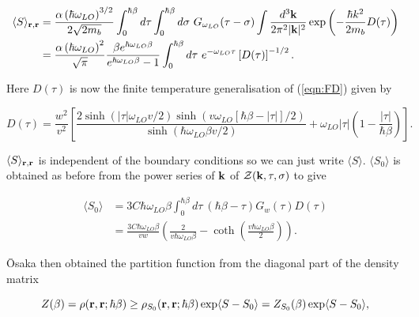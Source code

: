 \begin{equation}
    \begin{aligned}
        \langle S \rangle_{\vb{r}, \vb{r}} &= \frac{\alpha \left(\hbar \omega_{LO}\right)^{3/2}}{2\sqrt{2 m_b}} \int^{\hbar\beta}_0 d\tau \int^{\hbar\beta}_0 d\sigma\ G_{\omega_{LO}}(\tau - \sigma) \int \frac{d^3\vb{k}}{2\pi^2|\vb{k}|^2} \exp \left(-\frac{\hbar k^2}{2m_b} D(\tau)\right) \\
        &= \frac{\alpha \left( \hbar \omega_{LO}\right)^{2}}{\sqrt{\pi}} \frac{\beta e^{\hbar\omega_{LO}\beta}}{e^{\hbar\omega_{LO}\beta} - 1} \int^{\hbar\beta}_0 d\tau\ e^{-\omega_{LO}\tau} \left[D(\tau) \right]^{-1/2}.
    \end{aligned}
\end{equation}

Here $D(\tau)$ is now the finite temperature generalisation of (\ref{eqn:FD}) given by

\begin{equation}
    D(\tau) = \frac{w^2}{v^2} \left[ \frac{2\sinh(|\tau|\omega_{LO} v/2) \sinh(v \omega_{LO}[\hbar\beta - |\tau|] / 2)}{\sinh(\hbar\omega_{LO}\beta v /2)} + \omega_{LO}|\tau| \left(1 - \frac{|\tau|}{\hbar\beta}\right)\right].
\end{equation}

$ \langle S \rangle_{\vb{r}, \vb{r}}$ is independent of the boundary conditions so we can just write $\langle S \rangle$. $\langle S_0 \rangle$ is obtained as before from the power series of $\vb{k}$ of $\mathcal{Z}(\vb{k}, \tau, \sigma)$ to give

\begin{equation}
    \begin{aligned}
        \langle S_0 \rangle &= 3C\hbar\omega_{LO}\beta \int^{\hbar\beta}_0 d\tau\ (\hbar\beta - \tau) G_w(\tau) D(\tau) \\
        &= \frac{3C \hbar \omega_{LO} \beta}{vw} \left(\frac{2}{v\hbar\omega_{LO}\beta} - \coth\left(\frac{v\hbar\omega_{LO}\beta}{2}\right) \right).
    \end{aligned}
\end{equation}

\=Osaka then obtained the partition function from the diagonal part of the density matrix

\begin{equation}
    Z(\beta) = \rho(\vb{r}, \vb{r}; \hbar\beta) \geq \rho_{S_0}(\vb{r}, \vb{r}; \hbar\beta) \exp\langle S - S_0 \rangle = Z_{S_0}(\beta) \exp\langle S - S_0 \rangle,
\end{equation}

